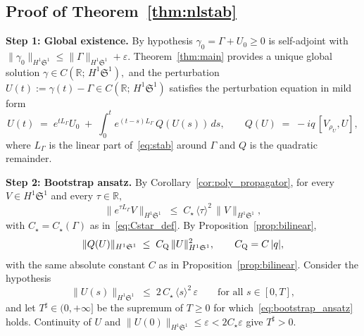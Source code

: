 \documentclass[11pt]{amsart}
\theoremstyle{definition}
\newcommand{\R}{\mathbb{R}}
\newcommand{\Sp}{\mathfrak{S}}
\begin{document}
\subsection{Proof of Theorem~\ref{thm:nlstab}}\label{subsec:proof_nlstab}

\noindent\textbf{Step 1: Global existence.} By hypothesis $\gamma_0=\Gamma+U_0\ge 0$ is self-adjoint with $\|\gamma_0\|_{H^1\Sp^1}\le\|\Gamma\|_{H^1\Sp^1}+\varepsilon.$ Theorem~\ref{thm:main} provides a unique global solution $\gamma\in C(\R;\,H^1\Sp^1),$ and the perturbation $U(t):=\gamma(t)-\Gamma\in C(\R;\,H^1\Sp^1)$ satisfies the perturbation equation in mild form
\begin{equation}\label{eq:nlstab_duhamel}
  U(t)\;=\; e^{tL_\Gamma}U_0
  \;+\;\int_0^t e^{(t-s)L_\Gamma}\,Q(U(s))\,ds,
  \qquad Q(U)\;=\; -iq\,[V_{\rho_U},U],
\end{equation}
where $L_\Gamma$ is the linear part of~\eqref{eq:stab} around $\Gamma$ and $Q$ is the quadratic remainder.

\medskip

\noindent\textbf{Step 2: Bootstrap ansatz.} By Corollary~\ref{cor:poly_propagator}, for every $V\in H^1\Sp^1$ and every $\tau\in\R,$
\begin{equation}\label{eq:poly_prop_inline}
  \|e^{\tau L_\Gamma}V\|_{H^1\Sp^1}
  \;\le\; C_\star\,\langle\tau\rangle^2\,
  \|V\|_{H^1\Sp^1},
\end{equation}
with $C_\star=C_\star(\Gamma)$ as in~\eqref{eq:Cstar_def}. By Proposition~\ref{prop:bilinear},
\begin{equation}\label{eq:Q_quad}
  \|Q(U)\|_{H^1\Sp^1}
  \;\le\; C_{\rm Q}\,\|U\|_{H^1\Sp^1}^2,
  \qquad
  C_{\rm Q}=C\,|q|,
\end{equation}
with the same absolute constant $C$ as in Proposition~\ref{prop:bilinear}. Consider the hypothesis
\begin{equation}\label{eq:bootstrap_ansatz}
  \|U(s)\|_{H^1\Sp^1}\;\le\; 2\,C_\star\,\langle s\rangle^2\,\varepsilon
  \qquad\text{for all }s\in[0,T],
\end{equation}
and let $T^\sharp\in(0,+\infty]$ be the supremum of $T\ge 0$ for which~\eqref{eq:bootstrap_ansatz} holds. Continuity of $U$ and $\|U(0)\|_{H^1\Sp^1}\le\varepsilon<2C_\star\varepsilon$ give $T^\sharp>0.$

\medskip
\end{document}
